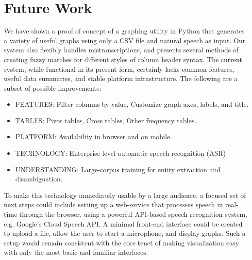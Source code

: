 \documentclass[11pt]{article}
\begin{document}
\section{Future Work}
We have shown a proof of concept of a graphing utility in Python that generates a variety of useful graphs using only a CSV file and natural speech as input. Our system also flexibly handles mistranscriptions, and presents several methods of creating fuzzy matches for different styles of column header syntax. The current system, while functional in its present form, certainly lacks common features, useful data summaries, and stable platform infrastructure. The following are a subset of possible improvements:
\begin{itemize}
\item FEATURES: Filter columns by value, Customize graph axes, labels, and title.
\item TABLES: Pivot tables, Cross tables, Other frequency tables.
\item PLATFORM: Availability in browser and on mobile.
\item TECHNOLOGY: Enterprise-level automatic speech recognition (ASR)
\item UNDERSTANDING: Large-corpus training for entity extraction and disambiguation.
\end{itemize}

To make this technology immediately usable by a large audience, a focused set of next steps could include setting up a web-service that processes speech in real-time through the browser, using a powerful API-based speech recognition system, e.g. Google's Cloud Speech API. A minimal front-end interface could be created to upload a file, allow the user to start a microphone, and display graphs. Such a setup would remain consistent with the core tenet of making visualization easy with only the most basic and familiar interfaces.

%
%
\end{document}
